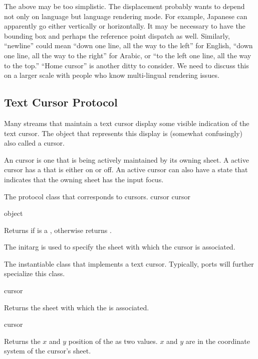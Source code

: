  {The above may be too simplistic. The displacement probably
wants to depend not only on language but language rendering mode.  For example,
Japanese can apparently go either vertically or horizontally.  It may be
necessary to have the bounding box and perhaps the reference point dispatch as
well.  Similarly, ``newline'' could mean ``down one line, all the way to the
left'' for English, ``down one line, all the way to the right'' for Arabic, or
``to the left one line, all the way to the top.''  ``Home cursor'' is another
ditty to consider.  We need to discuss this on a larger scale with people who
know multi-lingual rendering issues.}


\subsection {Text Cursor Protocol}

Many streams that maintain a text cursor display some visible indication of the
text cursor.  The object that represents this display is (somewhat confusingly)
also called a cursor.

An  cursor is one that is being actively maintained by its
owning sheet.  A active cursor has a  that is either on or off.
An active cursor can also have a state that indicates that the owning sheet has
the input focus.


The protocol class that corresponds to cursors.
 {cursor} {cursor}
\Mutable

 {object}

Returns  if  is a , otherwise returns
.


The  initarg is used to specify the sheet with which the cursor is
associated.


The instantiable class that implements a text cursor.  Typically, ports will
further specialize this class.

 {cursor}

Returns the sheet with which the   is associated.

 {cursor}

Returns the $x$ and $y$ position of the   as two
values.  $x$ and $y$ are in the coordinate system of the cursor's sheet.

